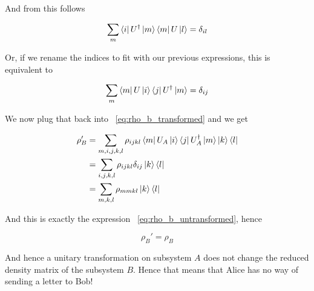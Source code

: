 \documentclass[11pt,a4paper]{article}
\begin{document}
And from this follows

\begin{align}
  \sum_{m} \bra{i}U^{\dagger}\ket{m}\bra{m}U\ket{l} = \delta_{il}
\end{align}

Or, if we rename the indices to fit with our previous expressions, this is equivalent to

\begin{align}
  \sum_{m} \bra{m}U\ket{i} \bra{j}U^{\dagger}\ket{m} = \delta_{ij}
\end{align}

We now plug that back into ~\eqref{eq:rho_b_transformed} and we get

\begin{align}
  \rho_{B}' &= \sum_{m, i, j, k, l} \rho_{ijkl} \bra{m}U_A\ket{i}\bra{j}U_A^{\dagger}\ket{m} \ket{k}\bra{l} \\
            &= \sum_{i, j, k, l} \rho_{ijkl} \delta_{ij} \ket{k}\bra{l} \\
            &= \sum_{m, k, l} \rho_{mmkl} \ket{k}\bra{l}
\end{align}

And this is exactly the expression ~\eqref{eq:rho_b_untransformed}, hence

\begin{equation}
  \rho_{B}' = \rho_{B}
\end{equation}

And hence a unitary transformation on subsystem $A$ does not change the reduced density matrix of
the subsystem $B$. Hence that means that Alice has no way of sending a letter to Bob!
\end{document}
